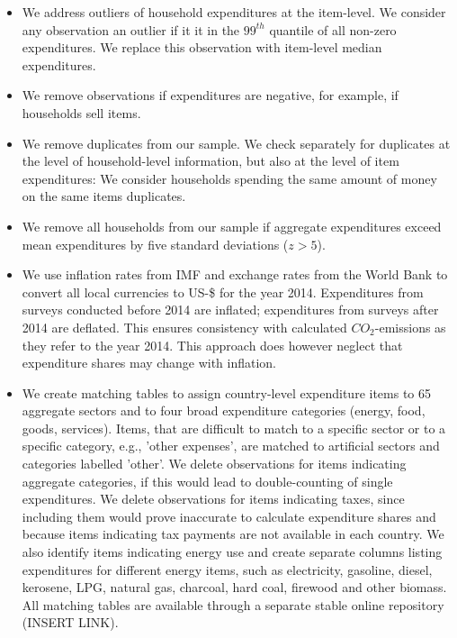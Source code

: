 \documentclass[12pt, a4paper]{article}
\begin{document}
\begin{itemize}
    \item We address outliers of household expenditures at the item-level. We consider any observation an outlier if it it in the $99^{th}$ quantile of all non-zero expenditures. We replace this observation with item-level median expenditures.
    \item We remove observations if expenditures are negative, for example, if households sell items.
    \item We remove duplicates from our sample. We check separately for duplicates at the level of household-level information, but also at the level of item expenditures: We consider households spending the same amount of money on the same items duplicates.
    \item We remove all households from our sample if aggregate expenditures exceed mean expenditures by five standard deviations ($z>5$).
    \item We use inflation rates from IMF and exchange rates from the World Bank to convert all local currencies to US-\$ for the year 2014. Expenditures from surveys conducted before 2014 are inflated; expenditures from surveys after 2014 are deflated. This ensures consistency with calculated $CO_{2}$-emissions as they refer to the year 2014. This approach does however neglect that expenditure shares may change with inflation.
    \item We create matching tables to assign country-level expenditure items to 65 aggregate sectors and to four broad expenditure categories (energy, food, goods, services). Items, that are difficult to match to a specific sector or to a specific category, e.g., 'other expenses', are matched to artificial sectors and categories labelled 'other'. We delete observations for items indicating aggregate categories, if this would lead to double-counting of single expenditures. We delete observations for items indicating taxes, since including them would prove inaccurate to calculate expenditure shares and because items indicating tax payments are not available in each country. We also identify items indicating energy use and create separate columns listing expenditures for different energy items, such as electricity, gasoline, diesel, kerosene, LPG, natural gas, charcoal, hard coal, firewood and other biomass. All matching tables are available through a separate stable online repository (INSERT LINK).
\end{itemize}

\end{document}
